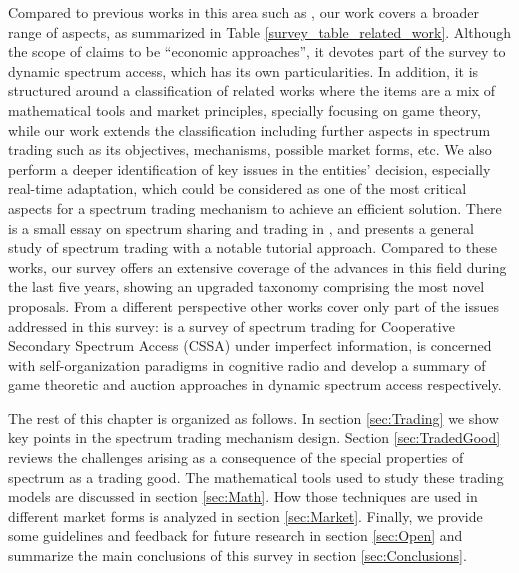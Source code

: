 Compared to previous works in this area such as \cite{ref:Maharjan2011,ref:Niyato2008_Spec,ref:Hossain2009,ref:Huang2013,ref:Zhang2013,ref:Akkara2011,ref:Zhang2012}, our work covers a broader range of aspects, as summarized in Table \ref{survey_table_related_work}.
Although the scope of \cite{ref:Maharjan2011} claims to be ``economic approaches'', it devotes part of the survey to dynamic spectrum access, which has its own particularities. 
In addition, it is structured around a classification of related works where the items are a mix of mathematical tools and market principles, specially focusing on game theory, while our work extends the classification including further aspects in spectrum trading such as its objectives, mechanisms, possible market forms, etc. 
We also perform a deeper identification of key issues in the entities' decision, especially real-time adaptation, which could be considered as one of the most critical aspects for a spectrum trading mechanism to achieve an efficient solution. 
There is a small essay on spectrum sharing and trading in \cite{ref:Niyato2008_Spec}, and \cite{ref:Hossain2009} presents a general study of spectrum trading with a notable tutorial approach. 
Compared to these works, our survey offers an extensive coverage of the advances in this field during the last five years, showing an upgraded taxonomy comprising the most novel proposals. 
From a different perspective other works cover only part of the issues addressed in this survey: \cite{ref:Huang2013} is a survey of spectrum trading for Cooperative Secondary Spectrum Access (CSSA) under imperfect information, \cite{ref:Zhang2013} is concerned with self-organization paradigms in cognitive radio and \cite{ref:Akkara2011,ref:Zhang2012} develop a summary of game theoretic and auction approaches in dynamic spectrum access respectively. 

The rest of this chapter is organized as follows. In section \ref{sec:Trading} we show key points in the spectrum trading mechanism design. Section \ref{sec:TradedGood} reviews the challenges arising as a consequence of the special properties of spectrum as a trading good. The mathematical tools used to study these trading models are discussed in section \ref{sec:Math}. How those techniques are used in different market forms is analyzed in section \ref{sec:Market}. Finally, we provide some guidelines and feedback for future research in section \ref{sec:Open} and summarize the main conclusions of this survey in section \ref{sec:Conclusions}.

